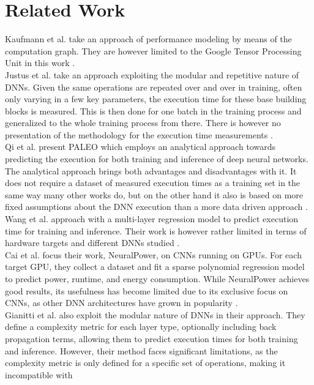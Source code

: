 \section{Related Work}
Kaufmann et al. take an approach of performance modeling by means of the computation graph. They are
however limited to the Google Tensor Processing Unit in this work \cite{kaufman_learned_2021}. \\
Justus et al. take an approach exploiting the modular and repetitive nature of DNNs. Given the same operations
are repeated over and over in training, often only varying in a few key parameters, the execution time for
these base building blocks is measured. This is then done for one batch in the training process and
generalized to the whole training process from there. There is however no presentation of the 
methodology for the execution time measurements \cite{justus_predicting_2018}. \\
Qi et al. present PALEO which employs an analytical approach towards predicting the execution for both
training and inference of deep neural networks. The analytical approach brings both advantages and disadvantages
with it. It does not require a dataset of measured execution times as a training set in the same way many 
other works do, but on the other hand it also is based on more fixed assumptions about the DNN execution 
than a more data driven approach \cite{qi_paleo_2017}. \\
Wang et al. approach with a multi-layer regression model to predict execution time for training and inference.
Their work is however rather limited in terms of hardware targets and different DNNs studied \cite{wang_perfnet_2020}. \\
Cai et al. focus their work, NeuralPower, on CNNs running on GPUs. For each target GPU, they collect
a dataset and fit a sparse polynomial regression model to predict power, runtime, and energy consumption.
While NeuralPower achieves good results, its usefulness has become limited due to its exclusive focus on 
CNNs, as other DNN architectures have grown in popularity \cite{cai_neuralpower_nodate}. \\
Gianitti et al. also exploit the modular nature of DNNs in their approach. They define a complexity
metric for each layer type, optionally including back propagation terms, allowing them to predict
execution times for both training and inference. However, their method faces significant limitations,
as the complexity metric is only defined for a specific set of operations, making it incompatible with
